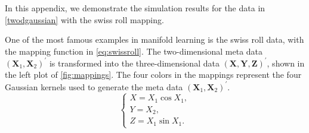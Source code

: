 \documentclass[11pt,a4paper,]{article}
\begin{document}
In this appendix, we demonstrate the simulation results for the data in \autoref{twodgaussian} with the swiss roll mapping.

One of the most famous examples in manifold learning is the swiss roll data, with the mapping function in \eqref{eq:swissroll}. The two-dimensional meta data \((\pmb{X}_1, \pmb{X}_2)^\prime\) is transformed into the three-dimensional data \((\pmb{X}, \pmb{Y}, \pmb{Z})^\prime\), shown in the left plot of \autoref{fig:mappings}. The four colors in the mappings represent the four Gaussian kernels used to generate the meta data \((\pmb{X}_1, \pmb{X}_2)^\prime\).
\begin{equation}
\label{eq:swissroll}
\left\{
\begin{array}{lcl}
X = X_1 \cos{X_1}, \\
Y = X_2, \\
Z = X_1 \sin{X_1}.
\end{array}
\right.
\end{equation}
\end{document}
